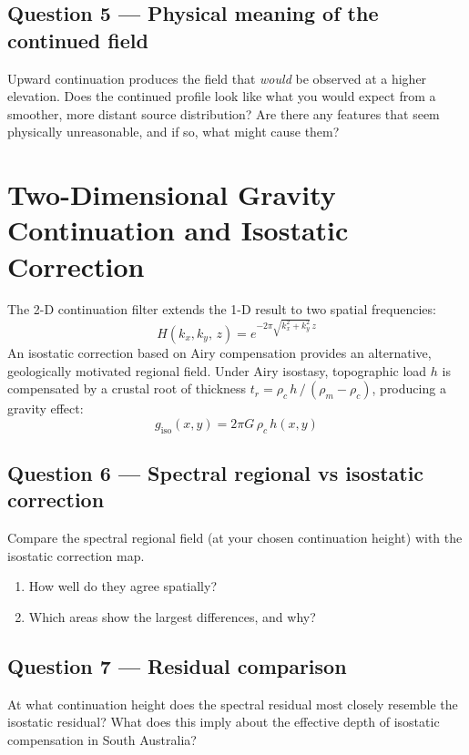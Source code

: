 \documentclass[11pt]{article}
\begin{document}
\subsection*{Question 5 — Physical meaning of the continued field}

Upward continuation produces the field that \emph{would} be observed at a higher
elevation.  Does the continued profile look like what you would expect from a
smoother, more distant source distribution?  Are there any features that seem
physically unreasonable, and if so, what might cause them?

\section{Two-Dimensional Gravity Continuation and Isostatic Correction}

The 2-D continuation filter extends the 1-D result to two spatial frequencies:
\[
  H(k_x, k_y,\, z) = e^{-2\pi \sqrt{k_x^2 + k_y^2}\, z}
\]
An isostatic correction based on Airy compensation provides an alternative,
geologically motivated regional field.  Under Airy isostasy, topographic load
$h$ is compensated by a crustal root of thickness
$t_r = \rho_c\,h\,/\,(\rho_m - \rho_c)$, producing a gravity effect:
\[
  g_\mathrm{iso}(x,y) = 2\pi G\,\rho_c\, h(x,y)
\]

\subsection*{Question 6 — Spectral regional vs isostatic correction}

Compare the spectral regional field (at your chosen continuation height) with
the isostatic correction map.
\begin{enumerate}[label=\alph*.]
  \item How well do they agree spatially?
  \item Which areas show the largest differences, and why?
\end{enumerate}

\subsection*{Question 7 — Residual comparison}

At what continuation height does the spectral residual most closely resemble the
isostatic residual?  What does this imply about the effective depth of isostatic
compensation in South Australia?
\end{document}
